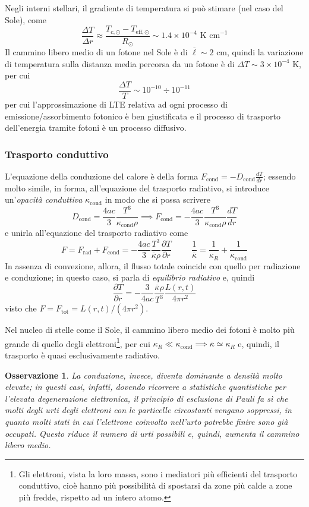\documentclass[11pt, a4paper]{scrartcl}
\theoremstyle{style}
\newtheorem{osservazione}{Osservazione}[section]
\theoremstyle{style1}
\numberwithin{equation}{subsection}
\begin{document}
Negli interni stellari, il gradiente di temperatura si pu\`o stimare (nel caso del Sole), come 
\[
\frac{\Delta T}{\Delta r} \approx \frac{T_{c,\odot }  - T_{\text{eff},\odot } }{R_\odot } \sim 1.4 \times 10^{-4} \text{ K cm}^{-1}
\] 
Il cammino libero medio di un fotone nel Sole \`e di $\overline{\ell } \sim 2$ cm, quindi la variazione di temperatura sulla distanza media percorsa da un fotone \`e di $\Delta T \sim 3\times 10^{-4} $ K, per cui 
\[
\frac{\Delta T}{T} \sim 10^{-10}\div 10^{-11}
\] 
per cui l'approssimazione di LTE relativa ad ogni processo di emissione/assorbimento fotonico \`e ben giustificata e il processo di trasporto dell'energia tramite fotoni \`e un processo diffusivo.

\subsubsection{Trasporto conduttivo}
L'equazione della conduzione del calore \`e della forma $F_\text{cond} = - D_\text{cond} \frac{d T}{d r} $; essendo molto simile, in forma, all'equazione del trasporto radiativo, si introduce un'\textit{opacit\`a conduttiva} $\kappa _\text{cond}$ in modo che si possa scrivere 
\[
D_\text{cond} = \frac{4 a c}{3} \frac{T^3}{\kappa _\text{cond}\rho } \implies F_\text{cond} = - \frac{4ac}{3} \frac{T^3}{\kappa _\text{cond}\rho } \frac{d T}{d r} 
\] 
e unirla all'equazione del trasporto radiativo come
\[
F = F_\text{rad} + F_\text{cond} = - \frac{4 ac}{3} \frac{T^3}{\overline{\kappa }\rho } \frac{\partial  T}{\partial  r}  \hspace{1cm} \frac{1}{\overline{\kappa }} = \frac{1}{\kappa _R} + \frac{1}{\kappa _\text{cond}}
\] 
In assenza di convezione, allora, il flusso totale coincide con quello per radiazione e conduzione; in questo caso, si parla di \textit{equilibrio radiativo} e, quindi
\begin{equation}
	\frac{\partial T}{\partial r} = - \frac{3}{4ac} \frac{\overline{\kappa }\rho }{T^3} \frac{L(r,t)}{4\pi r^2}
\end{equation}
visto che $F=F_\text{tot}=L(r,t) / (4\pi r^2)$.

Nel nucleo di stelle come il Sole, il cammino libero medio dei fotoni \`e molto pi\`u grande di quello degli elettroni\footnote{Gli elettroni, vista la loro massa, sono i mediatori pi\`u efficienti del trasporto conduttivo, cio\`e hanno pi\`u possibilit\`a di spostarsi da zone pi\`u calde a zone pi\`u fredde, rispetto ad un intero atomo.}, per cui $\kappa _R \ll \kappa _\text{cond} \implies \overline{\kappa } \simeq \kappa _R$ e, quindi, il trasporto \`e quasi esclusivamente radiativo.
\begin{osservazione}
La conduzione, invece, diventa dominante a densit\`a molto elevate; in questi casi, infatti, dovendo ricorrere a statistiche quantistiche per l'elevata degenerazione elettronica, il principio di esclusione di Pauli fa s\`i che molti degli urti degli elettroni con le particelle circostanti vengano soppressi, in quanto molti stati in cui l'elettrone coinvolto nell'urto potrebbe finire sono gi\`a occupati. 
Questo riduce il numero di urti possibili e, quindi, aumenta il cammino libero medio.
\end{osservazione}
\end{document}
